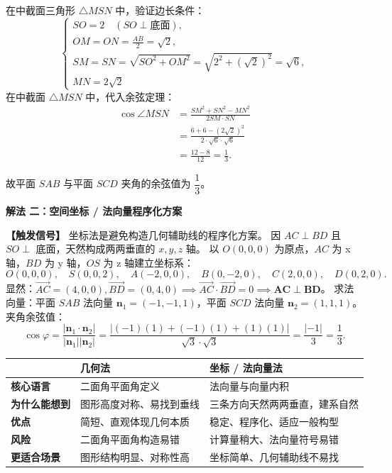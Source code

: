 \documentclass[11pt,a4paper,fontset=fandol]{ctexart}
\newcommand{\vect}[1]{\overrightarrow{#1}}
\newcommand{\ans}[1]{\boxed{#1}}
\newcommand{\method}[1]{\par\medskip\noindent\textbf{解法 #1}\par}
\begin{document}
在中截面三角形 $\triangle MSN$ 中，验证边长条件：
\[
\begin{cases}
SO = 2 \quad (SO \perp \text{底面}),\\[0.3em]
OM = ON = \frac{AB}{2} = \sqrt{2},\\[0.3em]
SM = SN = \sqrt{SO^2 + OM^2} = \sqrt{2^2 + (\sqrt{2})^2} = \sqrt{6},\\[0.3em]
MN = 2\sqrt{2}
\end{cases}
\]
在中截面 $\triangle MSN$ 中，代入余弦定理：
\begin{align*}
\cos\angle MSN &= \frac{SM^2 + SN^2 - MN^2}{2SM \cdot SN}\\[0.4em]
&= \frac{6 + 6 - (2\sqrt{2})^2}{2 \cdot \sqrt{6} \cdot \sqrt{6}}\\[0.4em]
&= \frac{12 - 8}{12} = \ans{\frac{1}{3}}.
\end{align*}

故平面 $SAB$ 与平面 $SCD$ 夹角的余弦值为 \(\ans{\dfrac{1}{3}}\)。

\method{二：空间坐标 / 法向量程序化方案}

\noindent\textbf{【触发信号】}
坐标法是避免构造几何辅助线的程序化方案。
因 $AC \perp BD$ 且 $SO \perp$ 底面，天然构成两两垂直的 $x, y, z$ 轴。
以 $O(0,0,0)$ 为原点，$AC$ 为 x 轴，$BD$ 为 y 轴，$OS$ 为 z 轴建立坐标系：
\[
O(0,0,0), \quad S(0,0,2), \quad A(-2,0,0), \quad B(0,-2,0), \quad C(2,0,0), \quad D(0,2,0).
\]
显然：$\vect{AC} = (4,0,0), \vect{BD} = (0,4,0) \implies \vect{AC} \cdot \vect{BD} = 0 \implies \mathbf{AC \perp BD}$。
求法向量：平面 $SAB$ 法向量 $\mathbf{n}_1 = (-1, -1, 1)$，平面 $SCD$ 法向量 $\mathbf{n}_2 = (1, 1, 1)$。
夹角余弦值：
\[
\cos\varphi = \frac{|\mathbf{n}_1 \cdot \mathbf{n}_2|}{|\mathbf{n}_1||\mathbf{n}_2|} = \frac{|(-1)(1) + (-1)(1) + (1)(1)|}{\sqrt{3} \cdot \sqrt{3}} = \frac{|-1|}{3} = \ans{\frac{1}{3}}.
\]

\begin{tcolorbox}[colback=blue!2!white,colframe=blue!50!black,boxrule=0.5pt,arc=1mm,title=\textbf{解法对照卡：几何法 vs 坐标法}]
\begin{center}
\small
\begin{tabular}{lll}
\toprule
 & \textbf{几何法} & \textbf{坐标 / 法向量法} \\
\midrule
\textbf{核心语言} & 二面角平面角定义 & 法向量与向量内积 \\
\textbf{为什么能想到} & 图形高度对称、易找到垂线 & 三条方向天然两两垂直，建系自然 \\
\textbf{优点} & 简短、直观体现几何本质 & 稳定、程序化、适应一般构型 \\
\textbf{风险} & 二面角平面角构造易错 & 计算量稍大、法向量符号易错 \\
\textbf{更适合场景} & 图形结构明显、对称性高 & 坐标简单、几何辅助线不易找 \\
\bottomrule
\end{tabular}
\end{center}
\end{tcolorbox}
\end{document}

